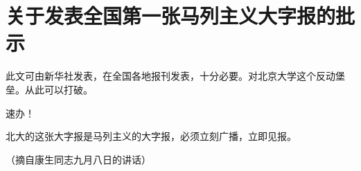 \section[关于发表全国第一张马列主义大字报的批示（一九六六年六月一日）]{关于发表全国第一张马列主义大字报的批示}


此文可由新华社发表，在全国各地报刊发表，十分必要。对北京大学这个反动堡垒。从此可以打破。

速办！

北大的这张大字报是马列主义的大字报，必须立刻广播，立即见报。

{\raggedleft （摘自康生同志九月八日的讲话）\par}


